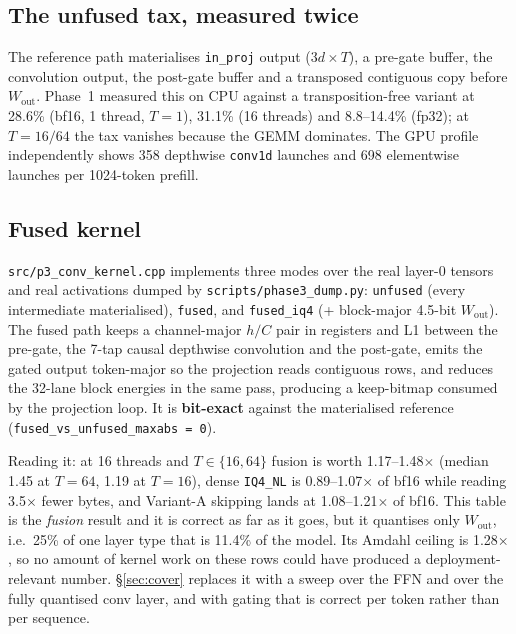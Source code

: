 \documentclass[11pt]{article}
\newcommand{\Wout}{\ensuremath{W_{\mathrm{out}}}}
\newcommand{\code}[1]{\texttt{\small #1}}
\begin{document}
\subsection{The unfused tax, measured twice}
The reference path materialises \code{in\_proj} output ($3d\times T$), a pre-gate buffer,
the convolution output, the post-gate buffer and a transposed contiguous copy before
\Wout. Phase~1 measured this on CPU against a transposition-free variant at 28.6\% (bf16,
1 thread, $T{=}1$), 31.1\% (16 threads) and 8.8--14.4\% (fp32); at $T{=}16/64$ the tax
vanishes because the GEMM dominates. The GPU profile independently shows 358 depthwise
\texttt{conv1d} launches and 698 elementwise launches per 1024-token prefill.

\subsection{Fused kernel}
\code{src/p3\_conv\_kernel.cpp} implements three modes over the real layer-0 tensors and
real activations dumped by \code{scripts/phase3\_dump.py}: \code{unfused} (every
intermediate materialised), \code{fused}, and \code{fused\_iq4} (+ block-major 4.5-bit
\Wout). The fused path keeps a channel-major $h/C$ pair in registers and L1 between the
pre-gate, the 7-tap causal depthwise convolution and the post-gate, emits the gated output
token-major so the projection reads contiguous rows, and reduces the 32-lane block
energies in the same pass, producing a keep-bitmap consumed by the projection loop.
It is \textbf{bit-exact} against the materialised reference (\code{fused\_vs\_unfused\_maxabs = 0}).

\begin{table}[h]\centering\small
\resizebox{\textwidth}{!}{}
\caption{Full measured sweep (real layer-0 tensors, real activations, median of 5
repetitions; ms). $\tau_{\mathrm{cal}}$ is the calibration budget; \textit{deg.} marks the
two shape-mismatched rows where the threshold keeps 0\% of blocks and the skip speedup is
therefore \emph{not} claimed. $T{=}1$ rows are decode-shaped and the shipped threshold is
wrong there by construction (see \S\ref{sec:rms}).}
\end{table}

Reading it: at 16 threads and $T{\in}\{16,64\}$ fusion is worth 1.17--1.48$\times$
(median 1.45 at $T{=}64$, 1.19 at $T{=}16$), dense \code{IQ4\_NL} is 0.89--1.07$\times$ of
bf16 while reading 3.5$\times$ fewer bytes, and Variant-A skipping lands at
1.08--1.21$\times$ of bf16. This table is the \emph{fusion} result and it is correct as far
as it goes, but it quantises only \Wout, i.e.\ 25\% of one layer type that is 11.4\% of
the model. Its Amdahl ceiling is 1.28$\times$, so no amount of kernel work on these rows
could have produced a deployment-relevant number. \S\ref{sec:cover} replaces it with a
sweep over the FFN and over the fully quantised conv layer, and with gating that is
correct per token rather than per sequence.
\end{document}
